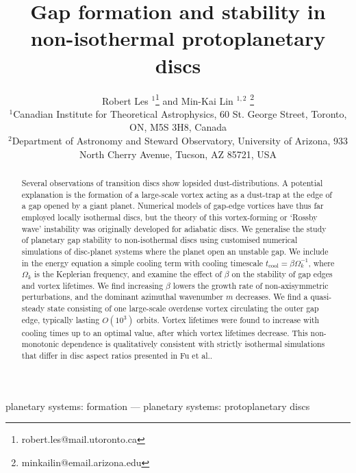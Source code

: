 \documentclass[useAMS,usenatbib]{mn2e}
\title[Gaps in non-isothermal discs]{Gap formation and stability in 
  non-isothermal protoplanetary discs}
\author[Les and Lin]{Robert Les
  $^1$\thanks{robert.les@mail.utoronto.ca} and Min-Kai Lin $^{1,2}$
  \thanks{ minkailin@email.arizona.edu} \\ 
$^1$Canadian Institute for Theoretical Astrophysics,  
60 St. George Street, Toronto, ON, M5S 3H8, Canada \\
$^2$Department of Astronomy and Steward Observatory, University of
Arizona, 933 North Cherry Avenue, Tucson, AZ 85721, USA 
}
\begin{document}
\maketitle
\begin{abstract}
Several observations of transition discs show lopsided
dust-distributions. A potential explanation is the formation of a
large-scale vortex acting as a dust-trap at the edge of a gap opened
by a giant planet. Numerical models of gap-edge vortices have
thus far employed locally isothermal discs, but the 
theory of this vortex-forming or `Rossby wave' instability was
originally developed for adiabatic discs.  
We generalise the study of planetary gap stability to non-isothermal
discs using customised numerical simulations of disc-planet
systems where the planet open an unstable gap. 
We include in the energy equation a simple cooling term with
cooling timescale $t_\mathrm{cool}=\beta\Omega_k^{-1}$, where $\Omega_k$ is
the Keplerian frequency, and examine the effect of $\beta$ on the
stability of gap edges and vortex lifetimes. We find increasing
$\beta$ lowers the growth rate of non-axisymmetric perturbations, and the
dominant azimuthal wavenumber $m$ decreases.  
We find a quasi-steady state consisting of one  
large-scale overdense vortex circulating the outer gap edge, typically  
lasting $O(10^3)$ orbits.  
Vortex lifetimes were found to increase with cooling times up to an
optimal value, after which vortex lifetimes decrease. This
non-monotonic dependence is qualitatively consistent with 
strictly isothermal simulations that differ in disc aspect ratios
presented in Fu et al..%


   


\end{abstract}

\begin{keywords}
planetary systems: formation --- planetary systems:
protoplanetary discs
\end{keywords}
\end{document}

